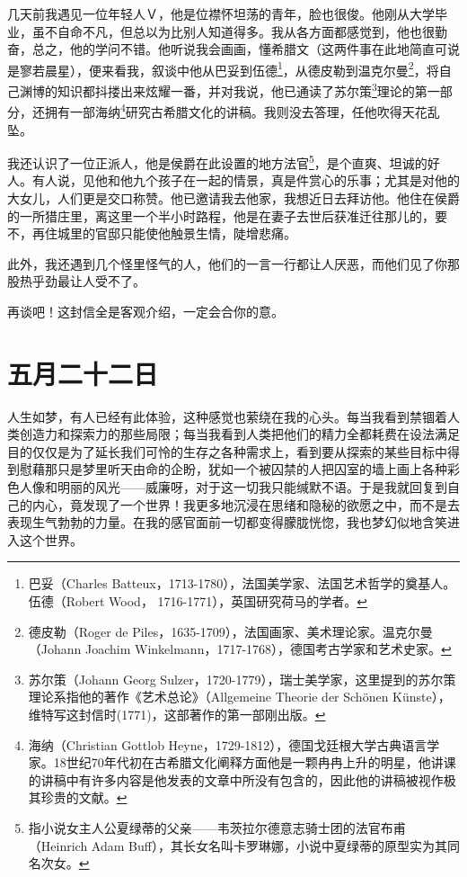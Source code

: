 \documentclass[12pt,oneside]{book}
\begin{document}
几天前我遇见一位年轻人Ｖ，他是位襟怀坦荡的青年，脸也很俊。他刚从大学毕业，虽不自命不凡，但总以为比别人知道得多。我从各方面都感觉到，他也很勤奋，总之，他的学问不错。他听说我会画画，懂希腊文（这两件事在此地简直可说是寥若晨星），便来看我，叙谈中他从巴妥到伍德\footnote{巴妥（Charles Batteux，1713-1780），法国美学家、法国艺术哲学的奠基人。伍德（Robert Wood， 1716-1771），英国研究荷马的学者。}，从德皮勒到温克尔曼\footnote{德皮勒（Roger de Piles，1635-1709），法国画家、美术理论家。温克尔曼（Johann Joachim Winkelmann，1717-1768），德国考古学家和艺术史家。}，将自己渊博的知识都抖搂出来炫耀一番，并对我说，他已通读了苏尔策\footnote{苏尔策（Johann Georg Sulzer，1720-1779），瑞士美学家，这里提到的苏尔策理论系指他的著作《艺术总论》（Allgemeine Theorie der Schönen Künste），维特写这封信时(1771)，这部著作的第一部刚出版。}理论的第一部分，还拥有一部海纳\footnote{海纳（Christian Gottlob Heyne，1729-1812），德国戈廷根大学古典语言学家。18世纪70年代初在古希腊文化阐释方面他是一颗冉冉上升的明星，他讲课的讲稿中有许多内容是他发表的文章中所没有包含的，因此他的讲稿被视作极其珍贵的文献。}研究古希腊文化的讲稿。我则没去答理，任他吹得天花乱坠。

我还认识了一位正派人，他是侯爵在此设置的地方法官\footnote{指小说女主人公夏绿蒂的父亲——韦茨拉尔德意志骑士团的法官布甫（Heinrich Adam Buff），其长女名叫卡罗琳娜，小说中夏绿蒂的原型实为其同名次女。}，是个直爽、坦诚的好人。有人说，见他和他九个孩子在一起的情景，真是件赏心的乐事；尤其是对他的大女儿，人们更是交口称赞。他已邀请我去他家，我想近日去拜访他。他住在侯爵的一所猎庄里，离这里一个半小时路程，他是在妻子去世后获准迁往那儿的，要不，再住城里的官邸只能使他触景生情，陡增悲痛。

此外，我还遇到几个怪里怪气的人，他们的一言一行都让人厌恶，而他们见了你那股热乎劲最让人受不了。

再谈吧！这封信全是客观介绍，一定会合你的意。

\chapter{五月二十二日}
人生如梦，有人已经有此体验，这种感觉也萦绕在我的心头。每当我看到禁锢着人类创造力和探索力的那些局限；每当我看到人类把他们的精力全都耗费在设法满足目的仅仅是为了延长我们可怜的生存之各种需求上，看到要从探索的某些目标中得到慰藉那只是梦里听天由命的企盼，犹如一个被囚禁的人把囚室的墙上画上各种彩色人像和明丽的风光——威廉呀，对于这一切我只能缄默不语。于是我就回复到自己的内心，竟发现了一个世界！我更多地沉浸在思绪和隐秘的欲愿之中，而不是去表现生气勃勃的力量。在我的感官面前一切都变得朦胧恍惚，我也梦幻似地含笑进入这个世界。
\end{document}
